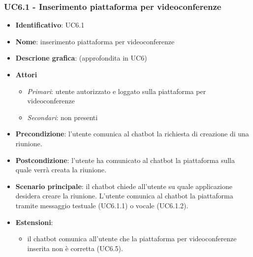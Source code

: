\subsubsection{UC6.1 - Inserimento piattaforma per videoconferenze}
\begin{itemize}
    \item \textbf{Identificativo}: UC6.1
    \item \textbf{Nome}: inserimento piattaforma per videoconferenze
    \item \textbf{Descrione grafica}: (approfondita in UC6)
    \item \textbf{Attori}
 \begin{itemize} 
    \item \textit{Primari}: utente autorizzato e loggato sulla piattaforma per videoconferenze
    \item \textit{Secondari}: non presenti
 \end{itemize}
 \item \textbf{Precondizione}: l'utente comunica al chatbot la richiesta di creazione di una riunione.
 \item \textbf{Postcondizione}: l'utente ha comunicato al chatbot la piattaforma sulla quale verrà creata la riunione.
 \item \textbf{Scenario principale}: il chatbot chiede all'utente su quale applicazione desidera creare la riunione. L'utente comunica al chatbot la piattaforma tramite messaggio testuale (UC6.1.1) o vocale (UC6.1.2).
 \item \textbf{Estensioni}: 
 \begin{itemize} 
    \item il chatbot comunica all'utente che la piattaforma per videoconferenze inserita non è corretta (UC6.5).
 \end{itemize}
\end{itemize}
